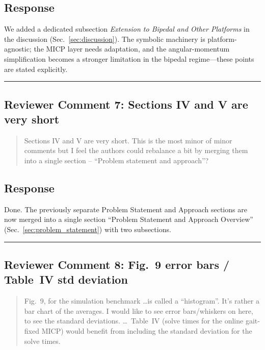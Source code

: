 \subsection{Response}
We added a dedicated subsection \textit{Extension to Bipedal and Other Platforms} in the discussion (Sec.~\ref{sec:discussion}). The symbolic machinery is platform-agnostic; the MICP layer needs adaptation, and the angular-momentum simplification becomes a stronger limitation in the bipedal regime---these points are stated explicitly.

\noindent\rule{17cm}{2.0pt}

\subsection{Reviewer Comment 7: Sections IV and V are very short}
\begin{mdframed}
\begin{quote}
Sections IV and V are very short. This is the most minor of minor comments but I feel the authors could rebalance a bit by merging them into a single section -- ``Problem statement and approach''?
\end{quote}
\end{mdframed}

\subsection{Response}
Done. The previously separate Problem Statement and Approach sections are now merged into a single section ``Problem Statement and Approach Overview'' (Sec.~\ref{sec:problem_statement}) with two subsections.

\noindent\rule{17cm}{2.0pt}

\subsection{Reviewer Comment 8: Fig.~9 error bars / Table~IV std deviation}
\begin{mdframed}
\begin{quote}
Fig.~9, for the simulation benchmark \ldots is called a ``histogram''. It's rather a bar chart of the averages. I would like to see error bars/whiskers on here, to see the standard deviations. \ldots\ Table~IV (solve times for the online gait-fixed MICP) would benefit from including the standard deviation for the solve times.
\end{quote}
\end{mdframed}

